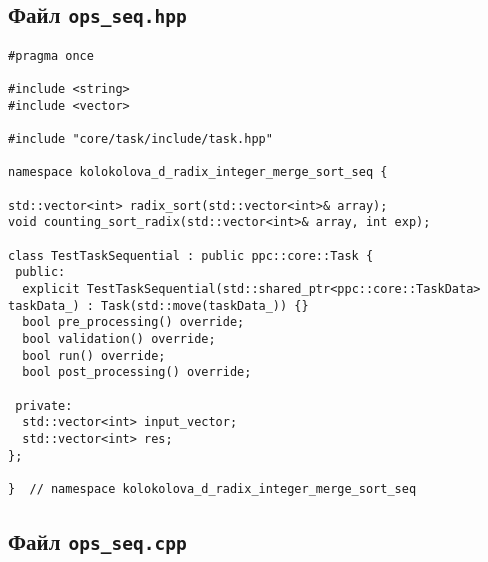 \documentclass[12pt]{article}
\begin{document}
\subsection*{Файл \texttt{ops\_seq.hpp}}

\begin{lstlisting}
#pragma once

#include <string>
#include <vector>

#include "core/task/include/task.hpp"

namespace kolokolova_d_radix_integer_merge_sort_seq {

std::vector<int> radix_sort(std::vector<int>& array);
void counting_sort_radix(std::vector<int>& array, int exp);

class TestTaskSequential : public ppc::core::Task {
 public:
  explicit TestTaskSequential(std::shared_ptr<ppc::core::TaskData> taskData_) : Task(std::move(taskData_)) {}
  bool pre_processing() override;
  bool validation() override;
  bool run() override;
  bool post_processing() override;

 private:
  std::vector<int> input_vector;
  std::vector<int> res;
};

}  // namespace kolokolova_d_radix_integer_merge_sort_seq
\end{lstlisting}

\subsection*{Файл \texttt{ops\_seq.cpp}}
\end{document}
